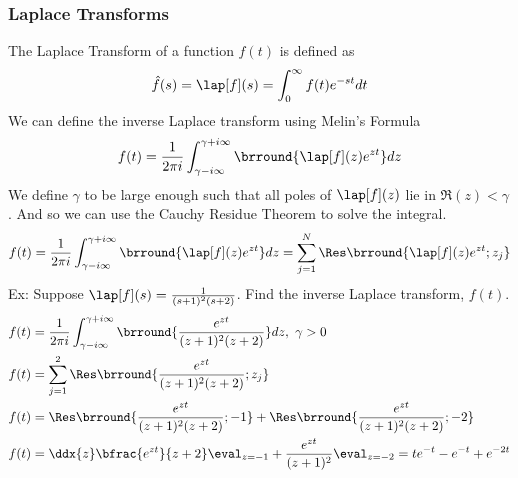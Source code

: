 \subsubsection{Laplace Transforms}
The Laplace Transform of a function $f(t)$ is defined as
\[\hat{f}(s)=\lap[f](s)=\int_0^\infty f(t)e^{-st}dt\]
We can define the inverse Laplace transform using Melin's Formula
\[f(t)=\frac{1}{2\pi i}\int_{\gamma-i\infty}^{\gamma+i\infty}\brround{\lap[f](z)e^{zt}}dz\]
We define $\gamma$ to be large enough such that all poles of $\lap[f](z)$ lie in $\Re(z)<\gamma$.
And so we can use the Cauchy Residue Theorem to solve the integral.
\[f(t)=\frac{1}{2\pi i}\int_{\gamma-i\infty}^{\gamma+i\infty}\brround{\lap[f](z)e^{zt}}dz=\sum_{j=1}^N\Res\brround{\lap[f](z)e^{zt};z_j}\]
Ex: Suppose $\lap[f](s)=\frac{1}{(s+1)^2(s+2)}$. Find the inverse Laplace transform, $f(t)$.
\begin{align*}
    &f(t)=\frac{1}{2\pi i}\int_{\gamma-i\infty}^{\gamma+i\infty}\brround{\frac{e^{zt}}{(z+1)^2(z+2)}}dz,\ \gamma>0\\
    &f(t)=\sum_{j=1}^2\Res\brround{\frac{e^{zt}}{(z+1)^2(z+2)};z_j}\\
    &f(t)=\Res\brround{\frac{e^{zt}}{(z+1)^2(z+2)};-1}+\Res\brround{\frac{e^{zt}}{(z+1)^2(z+2)};-2}\\
    &f(t)=\ddx{z}\bfrac{e^{zt}}{z+2}\eval_{z=-1}+\frac{e^{zt}}{(z+1)^2}\eval_{z=-2}=te^{-t}-e^{-t}+e^{-2t}
\end{align*}